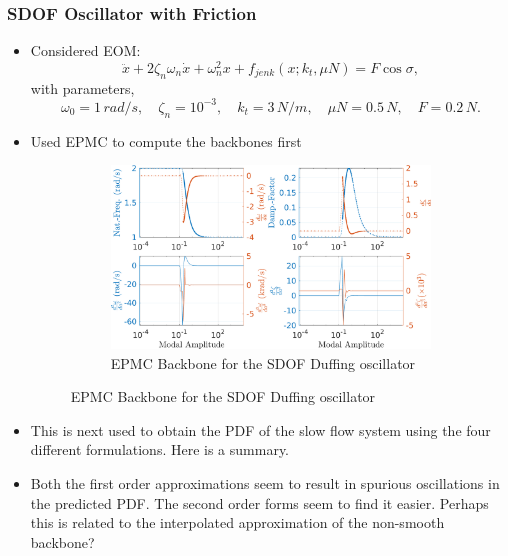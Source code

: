 \documentclass[11pt]{article}
\begin{document}
\subsubsection{SDOF Oscillator with Friction}
\label{sec:org79e5133}
\begin{itemize}
\item Considered EOM:
$$ \ddot{x} + 2\zeta_n\omega_n \dot{x}+\omega_n^2x + f_{jenk}(x; k_t, \mu N)=F\cos\sigma, $$
with parameters,
$$ \omega_0=1\,rad/s,\quad \zeta_n=10^{-3},\quad k_t=3\,N/m,\quad \mu N=0.5\,N,\quad F=0.2\,N. $$
\item Used EPMC to compute the backbones first
\begin{figure}
\begin{figure}[htbp]
\centering
\includegraphics[width=.9\linewidth]{FIGS/G1_SDOFEPMC_jenkins.png}
\caption{EPMC Backbone for the SDOF Duffing oscillator}
\end{figure}
\end{figure}
\item This is next used to obtain the PDF of the slow flow system using the four different formulations. Here is a summary.

\item Both the first order approximations seem to result in spurious oscillations in the predicted PDF. The second order forms seem to find it easier.
Perhaps this is related to the interpolated approximation of the non-smooth backbone?
\end{itemize}
\end{document}
